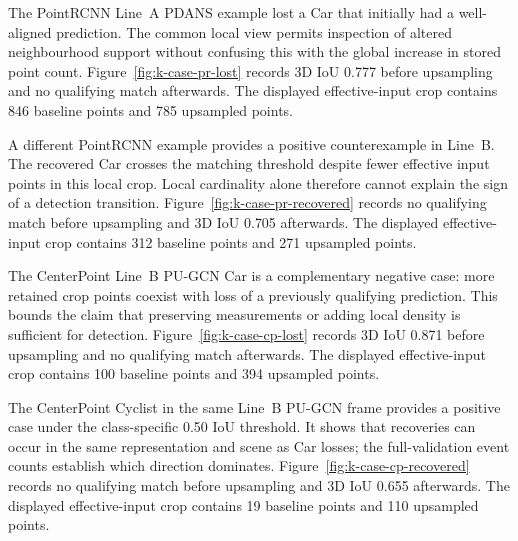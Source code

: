The PointRCNN Line~A PDANS example lost a Car that initially had a well-aligned prediction. The common local view permits inspection of altered neighbourhood support without confusing this with the global increase in stored point count.
Figure~\ref{fig:k-case-pr-lost} records 3D IoU 0.777 before upsampling and no qualifying match afterwards. The displayed effective-input crop contains 846 baseline points and 785 upsampled points.

\FloatBarrier

A different PointRCNN example provides a positive counterexample in Line~B. The recovered Car crosses the matching threshold despite fewer effective input points in this local crop. Local cardinality alone therefore cannot explain the sign of a detection transition.
Figure~\ref{fig:k-case-pr-recovered} records no qualifying match before upsampling and 3D IoU 0.705 afterwards. The displayed effective-input crop contains 312 baseline points and 271 upsampled points.

\FloatBarrier

The CenterPoint Line~B PU-GCN Car is a complementary negative case: more retained crop points coexist with loss of a previously qualifying prediction. This bounds the claim that preserving measurements or adding local density is sufficient for detection.
Figure~\ref{fig:k-case-cp-lost} records 3D IoU 0.871 before upsampling and no qualifying match afterwards. The displayed effective-input crop contains 100 baseline points and 394 upsampled points.

\FloatBarrier

The CenterPoint Cyclist in the same Line~B PU-GCN frame provides a positive case under the class-specific 0.50 IoU threshold. It shows that recoveries can occur in the same representation and scene as Car losses; the full-validation event counts establish which direction dominates.
Figure~\ref{fig:k-case-cp-recovered} records no qualifying match before upsampling and 3D IoU 0.655 afterwards. The displayed effective-input crop contains 19 baseline points and 110 upsampled points.

